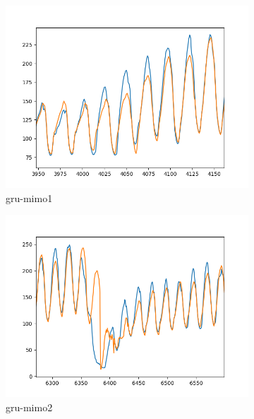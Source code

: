 \begin{figure}
    \centering
    \begin{subfigure}[b]{0.55\textwidth}
        \centering
        \includegraphics[width=\textwidth]{../Figures/gru-mimo-1.png}
        \caption{gru-mimo1}
        \label{fig:gru-mimo1}
    \end{subfigure}
    \hfill
    \begin{subfigure}[b]{0.55\textwidth}
        \centering
        \includegraphics[width=\textwidth]{../Figures/gru-mimo-2.png}
        \caption{gru-mimo2}
        \label{fig:gru-mimo2}
    \end{subfigure}
    \hfill
    \begin{subfigure}[b]{0.55\textwidth}

\end{subfigure}
\end{figure}
